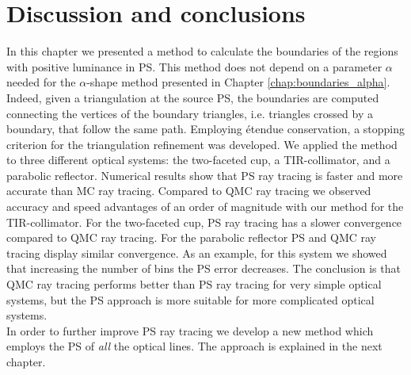 \section{Discussion and conclusions}
In this chapter we presented a method to calculate the boundaries of the regions with positive luminance in PS. This method does not depend on a parameter $\alpha$ needed for the $\alpha$-shape method presented in Chapter \ref{chap:boundaries_alpha}. Indeed, given a triangulation at the source PS, the boundaries are computed connecting the vertices of the boundary triangles, i.e. triangles crossed by a boundary, that follow the same path. Employing \'{e}tendue conservation, a stopping criterion for the triangulation refinement was developed. We applied the method to three different optical systems: the two-faceted cup, a TIR-collimator, and a parabolic reflector. Numerical results show that PS ray tracing is faster and more accurate than MC ray tracing. Compared to QMC ray tracing we observed accuracy and speed advantages of an order of magnitude with our method for the TIR-collimator. 
For the two-faceted cup, PS ray tracing has a slower convergence compared to QMC ray tracing. For the parabolic reflector PS and QMC ray tracing display similar convergence. As an example, for this system we showed that increasing the number of bins the PS error decreases. 
The conclusion is that QMC ray tracing performs better than PS ray tracing for very simple optical systems, but the PS approach is more suitable for more complicated optical systems.
\\ \indent In order to further improve PS ray tracing we develop a new method which employs the PS of \textit{all} the optical lines. The approach is explained in the next chapter.









 

